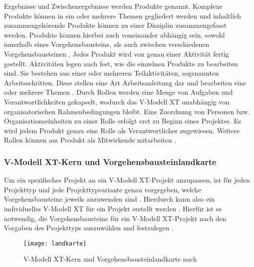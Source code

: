 Ergebnisse und Zwischenergebnisse werden Produkte genannt. Komplexe Produkte können in ein oder mehrere Themen gegliedert werden und inhaltlich zusammengehörende Produkte können zu einer Disziplin zusammengefasst werden. Produkte können hierbei auch voneinander abhängig sein, sowohl innerhalb eines Vorgehensbausteins, als auch zwischen verschiedenen Vorgehensbausteinen \cite{2004vmodell}.\newline
Jedes Produkt wird von genau einer Aktivität fertig gestellt. Aktivitäten legen auch fest, wie die einzelnen Produkte zu bearbeiten sind. Sie bestehen aus einer oder mehreren Teilaktivitäten, sogenannten Arbeitsschritten. Diese stellen eine Art Arbeitsanleitung dar und bearbeiten eine oder mehrere Themen \cite{2004vmodell}.\newline
Durch Rollen werden eine Menge von Aufgaben und Verantwortlichkeiten gekapselt, wodurch das V-Modell XT unabhängig von organisatorischen Rahmenbedingungen bleibt. Eine Zuordnung von Personen bzw. Organisationseinheiten zu einer Rolle erfolgt erst zu Beginn eines Projektes. Es wird jedem Produkt genau eine Rolle als Verantwortlicher zugewiesen. Weitere Rollen können am Produkt als Mitwirkende mitarbeiten \cite{2004vmodell}. \newline



\subsubsection{V-Modell XT-Kern und Vorgehensbausteinlandkarte}

Um ein spezifisches Projekt an ein V-Modell XT-Projekt anzupassen, ist für jeden Projekttyp und jede Projekttypvariante genau vorgegeben, welche Vorgehensbausteine jeweils anzuwenden sind \cite{2004vmodell}. Hierdurch kann also ein individuelles V-Modell XT für ein Projekt erstellt werden \cite{heinrich2007}. Hierfür ist es notwendig, die Vorgehensbausteine für ein V-Modell XT-Projekt nach den Vorgaben des Projekttyps auszuwählen und festzulegen \cite{2004vmodell}. \newline

\begin{figure}[htp]
\begin{center}
  \texttt{[image: landkarte]} %
  \caption{V-Modell XT-Kern und Vorgehensbausteinlandkarte nach \cite{2004vmodell}}
  \label{fig:landkarte}
\end{center}
\end{figure}

